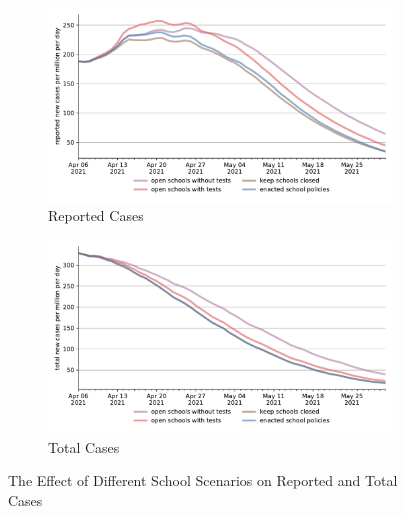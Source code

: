 \begin{figure}[ht] %
    \centering
    \begin{subfigure}[b]{.49\textwidth}
        \centering
        \includegraphics[width=0.9 \textwidth]{figures/results/figures/scenario_comparisons/school_scenarios/full_new_known_case}
        \caption{Reported Cases}
        \label{fig:school_scenarios_new_known_case}
    \end{subfigure}%
    \hfill
    \begin{subfigure}[b]{.49\textwidth}
        \centering
        \includegraphics[width=0.9 \textwidth]{figures/results/figures/scenario_comparisons/school_scenarios/full_newly_infected}
        \caption{Total Cases}
        \label{fig:school_scenarios_newly_infected}
    \end{subfigure}
    \caption{The Effect of Different School Scenarios on Reported and Total Cases}
    \label{fig:school_scenarios_detailed}
\end{figure}
